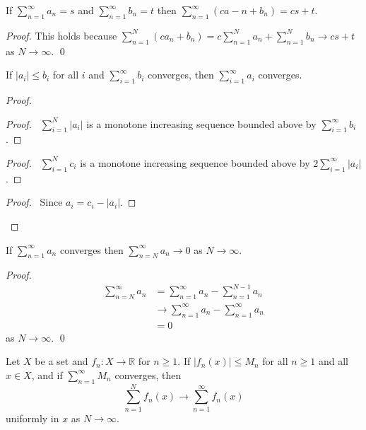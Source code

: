 \begin{prop}
  If $\sum_{n=1}^\infty a_n = s$ and $\sum_{n=1}^\infty b_n = t$ then
  $\sum_{n=1}^\infty (c a-n + b_n) = cs + t$.
\end{prop}

\begin{proof}
  \pf This holds because $\sum_{n=1}^N (c a_n + b_n) = c \sum_{n=1}^N a_n +
  \sum_{n=1}^N b_n \rightarrow cs + t$ as $N \rightarrow \infty$. \qed
\end{proof}

\begin{thm}
  If $|a_i| \leq b_i$ for all $i$ and $\sum_{i=1}^\infty b_i$ converges, then
  $\sum_{i=1}^\infty a_i$ converges.
\end{thm}

\begin{proof}
  \pf
  \begin{proof}
    \pf\ $\sum_{i=1}^N |a_i|$ is a monotone increasing sequence bounded above
    by $\sum_{i=1}^\infty b_i$.
  \end{proof}
  \begin{proof}
    \pf\ $\sum_{i=1}^N c_i$ is a monotone increasing sequence bounded above
    by
    $2 \sum_{i=1}^\infty |a_i|$.
  \end{proof}
  \qedstep
  \begin{proof}
    \pf\ Since $a_i = c_i - |a_i|$.
  \end{proof}
\end{proof}

\begin{lm}
  \label{lm:topology:metric:tail}
  If $\sum_{n=1}^\infty a_n$ converges then $\sum_{n=N}^\infty a_n
  \rightarrow 0$ as $N \rightarrow \infty$.
\end{lm}

\begin{proof}
  \pf
  \begin{align*}
    \sum_{n=N}^\infty a_n & = \sum_{n=1}^\infty a_n - \sum_{n=1}^{N-1} a_n \\
    & \rightarrow \sum_{n=1}^\infty a_n - \sum_{n=1}^\infty a_n \\
    & = 0
  \end{align*}
  as $N \rightarrow \infty$. \qed
\end{proof}

\begin{thm}
  Let $X$ be a set and $f_n : X \rightarrow \mathbb{R}$ for $n \geq 1$. If
  $|f_n(x)| \leq M_n$ for all $n \geq 1$ and all $x \in X$, and if
  $\sum_{n=1}^\infty M_n$ converges, then
  \[ \sum_{n=1}^N f_n(x) \rightarrow \sum_{n=1}^\infty f_n(x) \]
  uniformly in $x$ as $N \rightarrow \infty$.
\end{thm}

